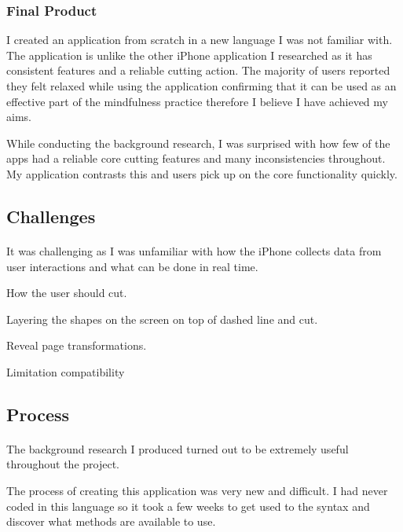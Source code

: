 \documentclass[11pt]{article}
\begin{document}
        \subsubsection{Final Product}
        I created an application from scratch in a new language I was not familiar with. The application is unlike the other iPhone application I researched as it has consistent features and a reliable cutting action. The majority of users reported they felt relaxed while using the application confirming that it can be used as an effective part of the mindfulness practice therefore I believe I have achieved my aims. 
        
        While conducting the background research, I was surprised with how few of the apps had a reliable core cutting features and many inconsistencies throughout. My application contrasts this and users pick up on the core functionality quickly.

        
    \subsection{Challenges}
    
        \paragraph{}
        It was challenging as I was unfamiliar with how the iPhone collects data from user interactions and what can be done in real time. 
        
        How the user should cut. 
        
        Layering the shapes on the screen on top of dashed line and cut.
        
        Reveal page transformations. 
        
        Limitation 
        compatibility
        
            \subsection{Process}
            \paragraph{}
            The background research I produced turned out to be extremely useful throughout the project.
            
            The process of creating this application was very new and difficult. I had never coded in this language so it took a few weeks to get used to the syntax and discover what methods are available to use. 
            
\end{document}
